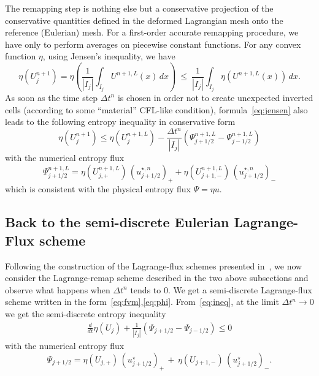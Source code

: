 \documentclass[graybox]{svmult}
\newcommand{\us}{u_{j+1/2}^\star}
\newcommand{\usn}{u_{j+1/2}^{\star,n}}
\begin{document}
The remapping step is nothing else but a conservative projection of the conservative quantities defined in the deformed Lagrangian mesh onto the reference (Eulerian) mesh. For a first-order accurate remapping procedure, we have only to perform averages
on piecewise constant functions. For any convex function $\eta$, using Jensen's inequality,
we have
%
\begin{equation}
%
\eta(U_j^{n+1})=
\eta\left(\frac{1}{|I_j|}\int_{I_j} U^{n+1,L}(x)\, dx\right) \ 
\leq \ \frac{1}{|I_j|}\int_{I_j} \eta(U^{n+1,L}(x))\, dx.
\label{eq:jensen}
\end{equation}
%
As soon as the time step $\Delta t^n$ is chosen in order not to create unexpected inverted cells (according to some ``material'' CFL-like condition), formula~\eqref{eq:jensen} also leads to the following entropy inequality in conservative form
%
\begin{equation}
\eta(U_j^{n+1}) \leq \eta(U_j^{n+1,L}) 
- \frac{\Delta t^n}{|I_j|} \left(\Psi_{j+1/2}^{n+1,L}-\Psi_{j-1/2}^{n+1,L}\right)
\label{eq:ineq}
\end{equation}
%
with the numerical entropy flux
\[
\Psi_{j+1/2}^{n+1,L} =  \eta(U_{j,+}^{n+1,L})\,(\usn)_+ 
                     + \eta(U_{j+1,-}^{n+1,L})\,(\usn)_-
\]
which is consistent with the physical entropy flux $\Psi=\eta u$. 
%
\vspace{-0.5cm}
\subsection{Back to the semi-discrete Eulerian Lagrange-Flux scheme}
%
Following the construction of the Lagrange-flux schemes presented in~\cite{FDV16},
we now consider the Lagrange-remap scheme described in the two above subsections 
and observe what happens when $\Delta t^n$ tends to 0. We get a semi-discrete
Lagrange-flux scheme written in the form~\eqref{eq:fvm},\eqref{eq:phi}.
From~\eqref{eq:ineq}, at the limit $\Delta t^n\rightarrow 0$ we get the
semi-discrete entropy inequality
%
\begin{eqnarray*}
\frac{d}{dt}\eta(U_j) + \frac{1}{|I_j|} \left(\Psi_{j+1/2}-\Psi_{j-1/2}\right) \leq 0
\label{eq:ineq2}
\end{eqnarray*}
%
with the numerical entropy flux
%
\begin{equation}
\Psi_{j+1/2} =  \eta(U_{j,+})\,(\us)_+  \,+\, \eta(U_{j+1,-})\, (\us)_-.
\label{eq:21}
\end{equation}
%
\vspace{-1.2cm}
\end{document}
